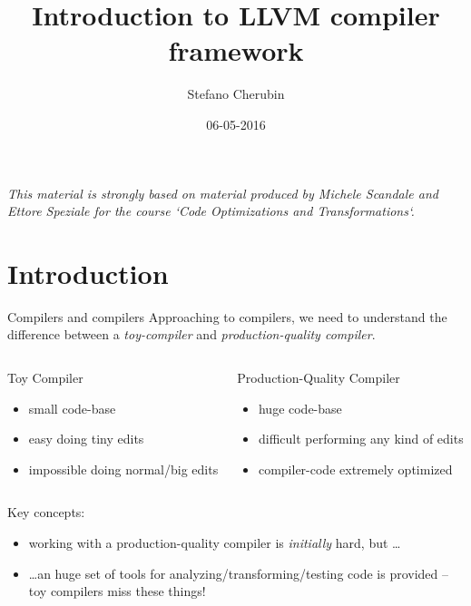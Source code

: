 \documentclass[10pt,mathserif]{beamer}
\author{Stefano Cherubin}
\institute{Politecnico di Milano}
\date{06-05-2016}
\title{Introduction to LLVM compiler framework}
\begin{document}
\begin{frame}
\maketitle
\begin{center}
\itshape\scriptsize This material is strongly based on material produced by
                    Michele Scandale and Ettore Speziale for the course
                    `Code Optimizations and Transformations`.
\end{center}
\end{frame}

\section{Introduction}
\begin{frame}{Compilers and compilers}
Approaching to compilers, we need to understand the difference between a
\emph{toy-compiler} and \emph{production-quality compiler}.
\begin{columns}[t]
\begin{block}{Toy Compiler}
\begin{itemize}
\item small code-base
\item easy doing tiny edits
\item impossible doing normal/big edits
\end{itemize}
\end{block}

\begin{block}{Production-Quality Compiler}
\begin{itemize}
\item huge code-base
\item difficult performing any kind of edits
\item compiler-code extremely optimized
\end{itemize}
\end{block}
\end{columns}

\vfill
Key concepts:

\begin{itemize}
\item working with a production-quality compiler is \emph{initially} \alert{hard},
      but \ldots
\item \ldots an huge set of tools for analyzing/transforming/testing code
      is provided -- toy compilers \alert{miss these things}!
\end{itemize}
\end{frame}
\end{document}
